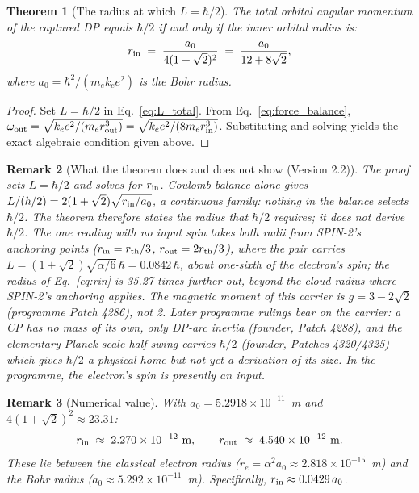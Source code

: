 \documentclass[12pt]{article}
\newtheorem{theorem}{Theorem}[section]
\newtheorem{remark}[theorem]{Remark}
\newcommand{\rin}{r_{\rm in}}
\newcommand{\rout}{r_{\rm out}}
\newcommand{\oout}{\omega_{\rm out}}
\newcommand{\aBohr}{a_0}
\begin{document}
\begin{theorem}[The radius at which $L = \hbar/2$]
\label{thm:spin}
The total orbital angular momentum of the captured DP equals $\hbar/2$
if and only if the inner orbital radius is:
\begin{equation}
  \rin \;=\; \frac{\aBohr}{4(1+\sqrt{2})^2}
  \;=\; \frac{\aBohr}{12+8\sqrt{2}},
  \label{eq:rin}
\end{equation}
where $\aBohr = \hbar^2/(m_e k_e e^2)$ is the Bohr radius.
\end{theorem}

\begin{proof}
Set $L = \hbar/2$ in Eq.~\eqref{eq:L_total}.  From
Eq.~\eqref{eq:force_balance}, $\oout = \sqrt{k_e e^2/(m_e\rout^3)} =
\sqrt{k_e e^2/(8m_e\rin^3)}$.  Substituting and solving yields the
exact algebraic condition given above.
\end{proof}

\begin{remark}[What the theorem does and does not show (Version 2.2)]
The proof sets $L = \hbar/2$ and solves for $\rin$. Coulomb balance alone gives
$L/(\hbar/2) = 2(1+\sqrt{2})\sqrt{\rin/\aBohr}$, a continuous family: nothing in the balance
selects $\hbar/2$. The theorem therefore states the radius that $\hbar/2$ requires; it does
not derive $\hbar/2$. The one reading with no input spin takes both radii from SPIN-2's
anchoring points ($\rin = r_{\rm th}/3$, $\rout = 2r_{\rm th}/3$), where the pair carries
$L = (1+\sqrt{2})\sqrt{\alpha/6}\,\hbar = 0.0842\,\hbar$, about one-sixth of the electron's spin;
the radius of Eq.~\eqref{eq:rin} is 35.27 times further out, beyond the cloud radius where
SPIN-2's anchoring applies. The magnetic moment of this carrier is $g = 3 - 2\sqrt{2}$
(programme Patch 4286), not 2. Later programme rulings bear on the carrier: a CP has no mass
of its own, only DP-arc inertia (founder, Patch 4288), and the elementary Planck-scale
half-swing carries $\hbar/2$ (founder, Patches 4320/4325) --- which gives $\hbar/2$ a physical
home but not yet a derivation of its size. In the programme, the electron's spin is presently
an input.
\end{remark}

\begin{remark}[Numerical value]
With $\aBohr = 5.2918\times 10^{-11}$~m and
$4(1+\sqrt{2})^2 \approx 23.31$:
\begin{equation}
  \rin \;\approx\; 2.270\times 10^{-12}\ \text{m},
  \qquad
  \rout \;\approx\; 4.540\times 10^{-12}\ \text{m}.
  \label{eq:rin_numeric}
\end{equation}
These lie between the classical electron radius
($r_e = \alpha^2\aBohr \approx 2.818\times 10^{-15}$~m) and the
Bohr radius ($\aBohr \approx 5.292\times 10^{-11}$~m).
Specifically, $\rin \approx 0.0429\,\aBohr$.
\end{remark}
\end{document}
